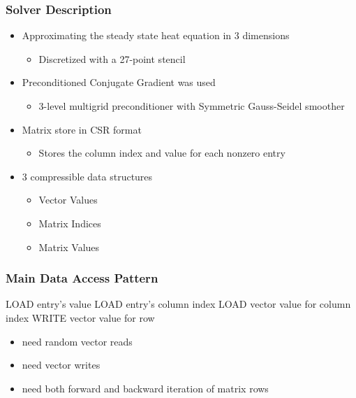 \documentclass{beamer}
\begin{document}
\begin{frame}
	\frametitle{Solver Description}
	\begin{itemize}
		\item Approximating the steady state heat equation in 3 dimensions
		\begin{itemize}
			\item Discretized with a 27-point stencil
		\end{itemize}
		\pause
		\item Preconditioned Conjugate Gradient was used
		\begin{itemize}
			\item 3-level multigrid preconditioner with Symmetric Gauss-Seidel smoother
		\end{itemize}
		\pause
		\item Matrix store in CSR format
		\begin{itemize}
			\item Stores the column index and value for each nonzero entry
		\end{itemize}
		\pause
		\item 3 compressible data structures
		\begin{itemize}
			\item Vector Values
			\item Matrix Indices
			\item Matrix Values
		\end{itemize}
	\end{itemize}
\end{frame}


\begin{frame}
	\frametitle{Main Data Access Pattern}
	\begin{algorithmic}
				\STATE LOAD entry's value
				\STATE LOAD entry's column index
				\STATE LOAD vector value for column index
			\ENDFOR
			\STATE WRITE vector value for row
		\ENDFOR
	\end{algorithmic}
	
	\begin{itemize}
		\pause
		\item need random vector reads
		\item need vector writes
		\item need both forward and backward iteration of matrix rows
	\end{itemize}
\end{frame}
\end{document}
